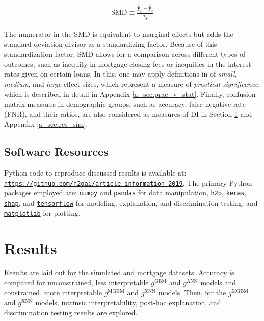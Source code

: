 \documentclass[information,article,submit,moreauthors,pdftex]{definitions/mdpi}
\begin{document}
\begin{equation}
\label{eq:smd}
\begin{aligned}
\text{SMD} \equiv \frac{\bar{\hat{\mathbf{y}}}_p - \bar{\hat{\mathbf{y}}}_c}{ \sigma_{\hat{\mathbf{y}}}}
\end{aligned}
\end{equation}

\noindent The numerator in the SMD is equivalent to marginal effects but adds the standard deviation divisor as a standardizing factor.  Because of this standardization factor, SMD allows for a comparison across different types of outcomes, such as inequity in mortgage closing fees or inequities in the interest rates given on certain loans.  In this, one may apply definitions in \citet{cohen1988statistical} of \textit{small}, \textit{medium}, and \textit{large} effect sizes, which represent a measure of \textit{practical significance}, which is described in detail in Appendix \ref{a_sec:prac_v_stat}. Finally, confusion matrix measures in demographic groups, such as accuracy, false negative rate (FNR), and their ratios, are also considered as measures of DI in Section \ref{sec:res} and Appendix \ref{a_sec:res_sim}.

\subsection{Software Resources}\label{ssec:soft}

Python code to reproduce discussed results is available at: \texttt{\url{https://github.com/h2oai/article-information-2019}}. The primary Python packages employed are: \href{https://numpy.org/}{\texttt{numpy}} and \href{https://pandas.pydata.org/}{\texttt{pandas}} for data manipulation, \href{https://github.com/h2oai/h2o-3}{\texttt{h2o}}, \href{https://keras.io/}{\texttt{keras}}, \href{https://github.com/slundberg/shap}{\texttt{shap}}, and \href{https://www.tensorflow.org/}{\texttt{tensorflow}} for modeling, explanation, and discrimination testing, and \href{https://matplotlib.org/}{\texttt{matplotlib}} for plotting. 

\section{Results}\label{sec:res}

Results are laid out for the simulated and mortgage datasets. Accuracy is compared for unconstrained, less interpretable $g^{\text{GBM}}$ and $g^{\text{ANN}}$ models and constrained, more interpretable $g^{\text{MGBM}}$ and $g^{\text{XNN}}$ models. Then, for the  $g^{\text{MGBM}}$ and $g^{\text{XNN}}$ models, intrinsic interpretability, post-hoc explanation, and discrimination testing results are explored.
\end{document}
